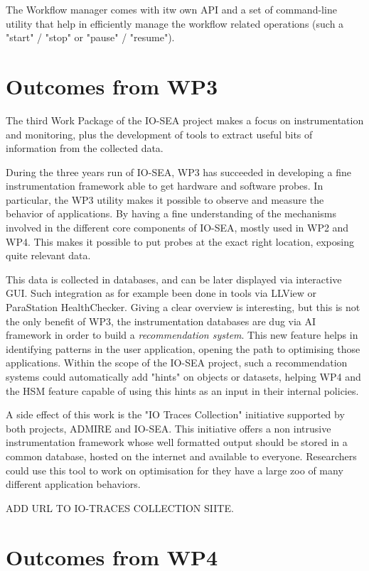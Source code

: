 The Workflow manager comes with itw own API and a set of command-line utility that help in efficiently manage
the workflow related operations (such a "start" / "stop" or "pause" / "resume"). 


\section{Outcomes from WP3}

The third Work Package of the IO-SEA project makes a focus on instrumentation and monitoring, plus the
development of tools to extract useful bits of information from the collected data. 

During the three years run of IO-SEA, WP3 has succeeded in developing a fine instrumentation framework able to
get hardware and software probes. In particular, the WP3 utility makes it possible to observe and measure the 
behavior of applications. By having a fine understanding of the mechanisms involved in the different core
components of IO-SEA, mostly used in WP2 and WP4. This makes it possible to put probes at the exact right 
location, exposing quite relevant data.

This data is collected in databases, and can be later displayed via interactive 
GUI. Such integration as for example been done in tools via LLView or ParaStation HealthChecker. Giving a clear
overview is interesting, but this is not the only benefit of WP3, the instrumentation databases are dug via 
AI framework in order to build a \textit{recommendation system}. This new feature helps in identifying patterns
in the user application, opening the path to optimising those applications. Within the scope of the IO-SEA
project, such a recommendation systems could automatically add "hints" on objects or datasets, helping WP4 and
the HSM feature capable of using this hints as an input in their internal policies.

A side effect of this work is the "IO Traces Collection" initiative supported by both projects, ADMIRE and
IO-SEA. This initiative offers a non intrusive instrumentation framework whose well formatted output should be
stored in a common database, hosted on the internet and available to everyone. Researchers could use this tool
to work on optimisation for they have a large zoo of many different application behaviors. 

ADD URL TO IO-TRACES COLLECTION SIITE.


\section{Outcomes from WP4}


